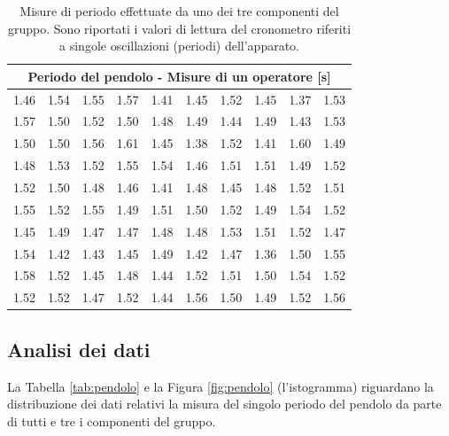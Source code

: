 \begin{table}
	\centering
	\begin{tabular} {c c c c c | c c c c c}
		\toprule
		\multicolumn{10}{c}{Periodo del pendolo - Misure di un operatore [s]} \\
		\midrule
		1.46 & 1.54 & 1.55 & 1.57 & 1.41 & 1.45 & 1.52 & 1.45 & 1.37 & 1.53 \\
		1.57 & 1.50 & 1.52 & 1.50 & 1.48 & 1.49 & 1.44 & 1.49 & 1.43 & 1.53 \\
		1.50 & 1.50 & 1.56 & 1.61 & 1.45 & 1.38 & 1.52 & 1.41 & 1.60 & 1.49 \\
		1.48 & 1.53 & 1.52 & 1.55 & 1.54 & 1.46 & 1.51 & 1.51 & 1.49 & 1.52 \\
		1.52 & 1.50 & 1.48 & 1.46 & 1.41 & 1.48 & 1.45 & 1.48 & 1.52 & 1.51 \\
		\midrule
		1.55 & 1.52 & 1.55 & 1.49 & 1.51 & 1.50 & 1.52 & 1.49 & 1.54 & 1.52 \\
		1.45 & 1.49 & 1.47 & 1.47 & 1.48 & 1.48 & 1.53 & 1.51 & 1.52 & 1.47 \\
		1.54 & 1.42 & 1.43 & 1.45 & 1.49 & 1.42 & 1.47 & 1.36 & 1.50 & 1.55 \\
		1.58 & 1.52 & 1.45 & 1.48 & 1.44 & 1.52 & 1.51 & 1.50 & 1.54 & 1.52 \\
		1.52 & 1.52 & 1.47 & 1.52 & 1.44 & 1.56 & 1.50 & 1.49 & 1.52 & 1.56 \\
	\bottomrule
	\end{tabular}
	\caption{Misure di periodo effettuate da uno dei tre componenti del gruppo.
        Sono riportati i valori di lettura del cronometro riferiti a singole oscillazioni
        (periodi) dell'apparato.}
    \label{tab:pendolo100}
\end{table}

\subsection{Analisi dei dati}

La Tabella \ref{tab:pendolo} e la Figura \ref{fig:pendolo} (l'istogramma) riguardano la distribuzione dei dati
relativi la misura del singolo periodo del pendolo da parte di tutti e tre i
componenti del gruppo.

